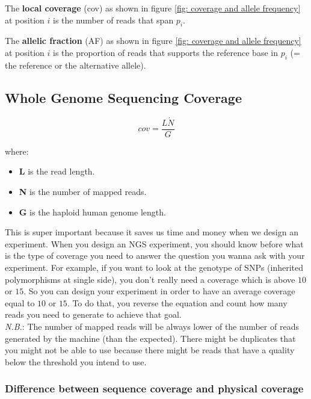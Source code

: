 The \textbf{local coverage} (cov) as shown in figure \ref{fig: coverage and
allele frequency} at position $i$ is the number of reads that span
$p_i$.

The \textbf{allelic fraction} (AF) as shown in figure \ref{fig: coverage and
allele frequency} at position $i$ is the proportion of reads that supports
the reference base in $p_i$ (= the reference or the
alternative allele).

\subsection{Whole Genome Sequencing Coverage}

\begin{equation} \label{eq: coverage formula}
  cov = \frac{L \dot N}{G}
\end{equation}

where:

\begin{itemize}
\item
  \textbf{L} is the read length.
\item
  \textbf{N} is the number of mapped reads.
\item
  \textbf{G} is the haploid human genome length.
\end{itemize}


This is super important because it saves us time and money when we design an
experiment. When you design an NGS experiment, you should know before what is
the type of coverage you need to answer the question you wanna ask with your
experiment. For example, if you want to look at the genotype of SNPs (inherited
polymorphisms at single side), you don't really need a coverage which is above
$10$ or $15$. So you can design your experiment in order to have an average coverage
equal to $10$ or $15$. To do that, you reverse the equation and count how many reads
you need to generate to achieve that goal. \\

\textit{N.B.}: The number of mapped reads will be always lower of the number of reads
generated by the machine (than the expected). There might be duplicates that you
might not be able to use because there might be reads that have a quality below
the threshold you intend to use.


\hypertarget{difference-between-sequence-coverage-and-physical-coverage}{%
\subsubsection{Difference between sequence coverage and physical
coverage}\label{difference-between-sequence-coverage-and-physical-coverage}}


